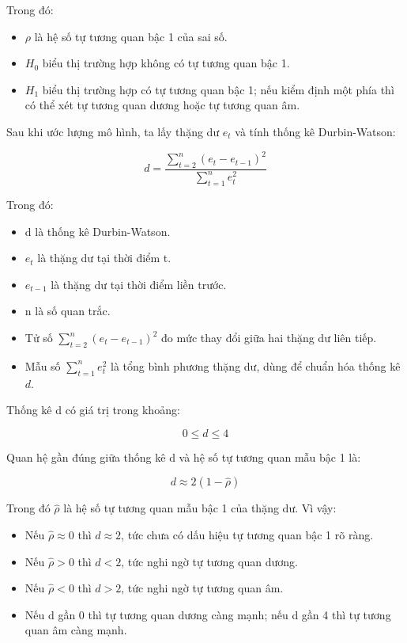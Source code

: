 \documentclass[12pt,a4paper]{article}
\begin{document}
Trong đó:

\begin{itemize}
\item
  \(\rho\) là hệ số tự tương quan bậc 1 của sai số.
\item
  \(H_0\) biểu thị trường hợp không có tự tương quan bậc 1.
\item
  \(H_1\) biểu thị trường hợp có tự tương quan bậc 1; nếu kiểm định một phía
  thì có thể xét tự tương quan dương hoặc tự tương quan âm.
\end{itemize}

Sau khi ước lượng mô hình, ta lấy thặng dư \(e_t\) và tính thống kê
Durbin-Watson:

\[
d=\frac{\sum_{t=2}^{n}(e_t-e_{t-1})^2}{\sum_{t=1}^{n}e_t^2}
\]

Trong đó:

\begin{itemize}
\item
  d là thống kê Durbin-Watson.
\item
  \(e_t\) là thặng dư tại thời điểm t.
\item
  \(e_{t-1}\) là thặng dư tại thời điểm liền trước.
\item
  n là số quan trắc.
\item Tử số 
    $\sum_{t=2}^{n}(e_t - e_{t-1})^2$
    đo mức thay đổi giữa hai thặng dư liên tiếp.

\item Mẫu số 
    $\sum_{t=1}^{n} e_t^2$
    là tổng bình phương thặng dư, dùng để chuẩn hóa thống kê $d$.
\end{itemize}

Thống kê d có giá trị trong khoảng:

\[
0\le d\le 4
\]

Quan hệ gần đúng giữa thống kê d và hệ số tự tương quan mẫu bậc 1 là:

\[
d\approx 2(1-\hat{\rho})
\]

Trong đó \(\hat{\rho}\) là hệ số tự tương quan mẫu bậc 1 của thặng dư. Vì vậy:

\begin{itemize}
\item
  Nếu \(\hat{\rho}\approx 0\) thì \(d\approx 2\), tức chưa có dấu hiệu tự tương quan bậc 1 rõ ràng.
\item
  Nếu \(\hat{\rho}>0\) thì \(d<2\), tức nghi ngờ tự tương quan
  dương.
\item
  Nếu \(\hat{\rho}<0\) thì \(d>2\), tức nghi ngờ tự tương quan
  âm.
\item
  Nếu d gần 0 thì tự tương quan dương càng mạnh; nếu d gần 4 thì tự
  tương quan âm càng mạnh.
\end{itemize}
\end{document}
